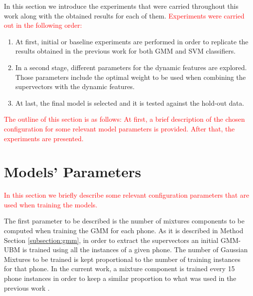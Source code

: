 
In this section we introduce the experiments that were carried throughout this work
along with the obtained results for each of them. \textcolor{red}{Experiments were carried
out in the following order:}

\begin{enumerate}
	\item At first, initial or baseline
	experiments are performed in order to replicate the results
	obtained in the previous work \cite{main} for both GMM and SVM classifiers.
	\item In a second stage, different parameters for the dynamic features are explored.
	Those parameters include the optimal weight to be used when combining the
	supervectors with the dynamic features.
	\item At last, the final model is selected and it is tested against the hold-out data.
\end{enumerate}


\textcolor{red}{The outline of this section is as follows: At first, a brief description of the
chosen configuration
for some relevant model parameters is provided.
After that, the experiments are presented.}

\section{Models' Parameters}

\textcolor{red}{In this section we briefly describe some relevant configuration parameters that
are used when training the models.}

The first parameter to be described is the number of mixtures components
to be computed when training the GMM for each phone. As it is described in Method Section
\ref{subsection:gmm}, in order to extract the supervectors an initial GMM-UBM is trained
using all the instances of a given phone.
The number of Gaussian Mixtures to be trained is kept proportional to the number of
training instances for that phone. In the current work, a
mixture component is trained every 15 phone instances
in order to keep a similar proportion to what was used in the previous work \cite{main} .

